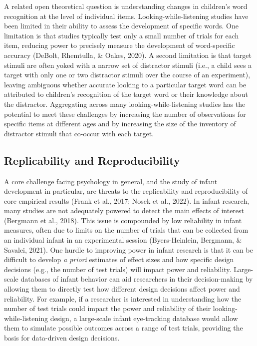 \documentclass[
  english,
  man,floatsintext]{apa6}
\begin{document}
A related open theoretical question is understanding changes in children's word recognition at the level of individual items.
Looking-while-listening studies have been limited in their ability to assess the development of specific words.
One limitation is that studies typically test only a small number of trials for each item, reducing power to precisely measure the development of word-specific accuracy (DeBolt, Rhemtulla, \& Oakes, 2020).
A second limitation is that target stimuli are often yoked with a narrow set of distractor stimuli (i.e., a child sees a target with only one or two distractor stimuli over the course of an experiment), leaving ambiguous whether accurate looking to a particular target word can be attributed to children's recognition of the target word or their knowledge about the distractor.
Aggregating across many looking-while-listening studies has the potential to meet these challenges by increasing the number of observations for specific items at different ages and by increasing the size of the inventory of distractor stimuli that co-occur with each target.

\hypertarget{replicability-and-reproducibility}{%
\subsection{Replicability and Reproducibility}\label{replicability-and-reproducibility}}

A core challenge facing psychology in general, and the study of infant development in particular, are threats to the replicability and reproducibility of core empirical results (Frank et al., 2017; Nosek et al., 2022).
In infant research, many studies are not adequately powered to detect the main effects of interest (Bergmann et al., 2018).
This issue is compounded by low reliability in infant measures, often due to limits on the number of trials that can be collected from an individual infant in an experimental session (Byers-Heinlein, Bergmann, \& Savalei, 2021).
One hurdle to improving power in infant research is that it can be difficult to develop \emph{a priori} estimates of effect sizes and how specific design decisions (e.g., the number of test trials) will impact power and reliability.
Large-scale databases of infant behavior can aid researchers in their decision-making by allowing them to directly test how different design decisions affect power and reliability.
For example, if a researcher is interested in understanding how the number of test trials could impact the power and reliability of their looking-while-listening design, a large-scale infant eye-tracking database would allow them to simulate possible outcomes across a range of test trials, providing the basis for data-driven design decisions.
\end{document}
